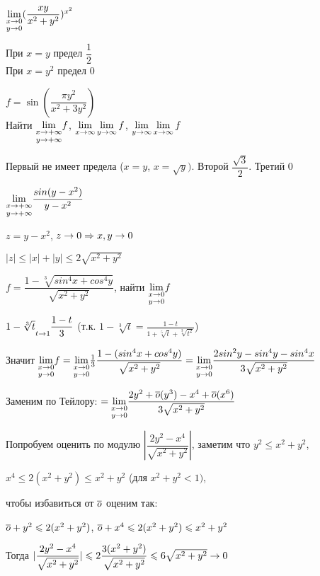 \documentclass[main]{subfiles}
\begin{document}
    \begin{example}
        $\underset{y \rightarrow 0}{\lim\limits_{x \rightarrow 0}} (\dfrac{x y}{x^2+y^2})^{x^2}$
    \end{example}

    \begin{sol}
        При $x=y$ предел $\dfrac{1}{2}$\\
        При $x=y^2$ предел 0
    \end{sol}

    \begin{example}
        $f=\sin(\dfrac{\pi y^2}{x^2 + 3y^2})$\\
        Найти $\underset{y \rightarrow +\infty}{\lim\limits_{x \rightarrow +\infty}} f$, $\lim\limits_{x \rightarrow \infty} \lim\limits_{y \rightarrow \infty} f$, $\lim\limits_{y \rightarrow \infty} \lim\limits_{x \rightarrow \infty} f$
    \end{example}

    \begin{sol}
        Первый не имеет предела ($x=y$, $x=\sqrt{y})$. Второй $\dfrac{\sqrt{3}}{2}$. Третий 0
    \end{sol}

    \begin{example}
        $\underset{y \rightarrow +\infty}{\lim\limits_{x \rightarrow +\infty}} \dfrac{sin(y-x^2)}{y-x^2}$
    \end{example}

    \begin{sol}
        $z=y-x^2$, $z \rightarrow 0 \Rightarrow x,y \rightarrow 0$

        $|z| \leqslant |x| + |y| \leqslant 2 \sqrt{x^2+y^2}$
    \end{sol}

    \begin{example}
        $f=\dfrac{1-\sqrt[3]{sin^4 x + cos^4 y}}{\sqrt{x^2+y^2}}$, найти $\underset{y \rightarrow 0}{\lim\limits_{x \rightarrow 0}} f$
    \end{example}

    \begin{sol}
        $1-\sqrt[3]{t} \underset{t \rightarrow 1}{~} \dfrac{1-t}{3}$ (т.к. $1-\sqrt[3]{t}=\frac{1-t}{1+\sqrt[5]{t}+\sqrt[3]{t^2}}$)

        Значит $\underset{y \rightarrow 0}{\lim\limits_{x \rightarrow 0}} f = \underset{y \rightarrow 0}{\lim\limits_{x \rightarrow 0}} \frac{1}{3} \dfrac{1-(sin^4 x + cos^4 y)}{\sqrt{x^2+y^2}} = \underset{y \rightarrow 0}{\lim\limits_{x \rightarrow 0}} \dfrac{2sin^2 y - sin^4 y - sin^4 x}{3 \sqrt{x^2+y^2}}$

        Заменим по Тейлору: $=\underset{y \rightarrow 0}{\lim\limits_{x \rightarrow 0}} \dfrac{2y^2 + \overline{o}(y^3)-x^4 + \overline{o}(x^6)}{3 \sqrt{x^2+y^2}}$

        Попробуем оценить по модулю $|\dfrac{2y^2-x^4}{\sqrt{x^2+y^2}}|$, заметим что $y^2 \leqslant x^2 + y^2$,

        $x^4 \leqslant 2(x^2+y^2) \leqslant x^2+y^2$ (для $x^2+y^2 < 1)$,

        чтобы избавиться от $\overline{o}$ оценим так:

        $\overline{o} + y^2 \leqslant 2(x^2 + y^2)$, $\overline{o} + x^4 \leqslant 2(x^2+y^2) \leqslant x^2+y^2$

        Тогда $|\dfrac{2y^2-x^4}{\sqrt{x^2+y^2}}| \leqslant 2 \dfrac{3(x^2+y^2)}{\sqrt{x^2+y^2}} \leqslant 6 \sqrt{x^2+y^2} \rightarrow 0$
    \end{sol}
\end{document}
